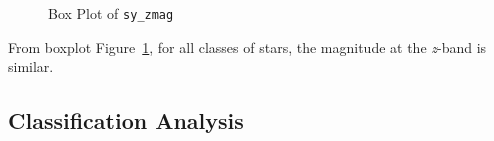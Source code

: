 \documentclass[
  letterpaper,
  DIV=11,
  numbers=noendperiod]{scrartcl}
\begin{document}
\begin{longtable}[]
\end{longtable}

\begin{figure}[H]


\caption{\label{fig-sy-zmag}Box Plot of \texttt{sy\_zmag}}

\end{figure}%

From boxplot Figure~\ref{fig-sy-zmag}, for all classes of stars, the
magnitude at the \emph{z}-band is similar.

\subsection{Classification Analysis}\label{classification-analysis}
\end{document}
